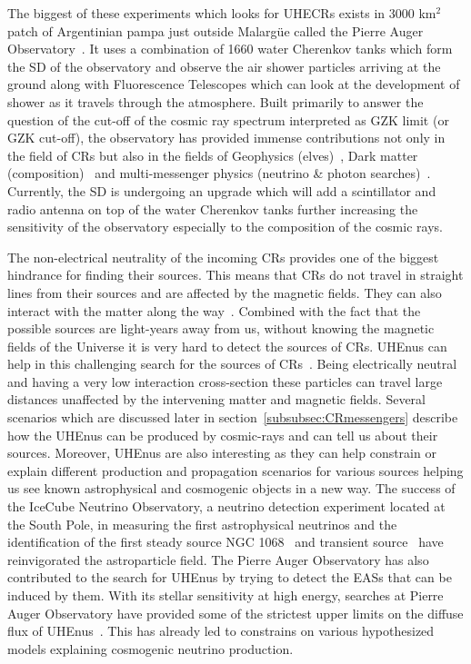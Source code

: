 The biggest of these experiments which looks for \glspl{UHECR} exists in 3000 km$^2$ patch of Argentinian pampa just outside Malargüe called the Pierre Auger Observatory~\cite{Auger:2015}. It uses a combination of 1660 water Cherenkov tanks which form the \gls{SD} of the observatory and observe the air shower particles arriving at the ground along with Fluorescence Telescopes which can look at the development of shower as it travels through the atmosphere. Built primarily to answer the question of the cut-off of the cosmic ray spectrum interpreted as \gls{GZK} limit (or GZK cut-off), the observatory has provided immense contributions not only in the field of \glspl{CR} but also in the fields of Geophysics (elves)~\cite{Mussa_2022}, Dark matter (composition)~\cite{Abreu_2023} and multi-messenger physics (neutrino \& photon searches)~\cite{Aab_2019_point,Auger_photons_2022}. Currently, the \gls{SD} is undergoing an upgrade which will add a scintillator and radio antenna on top of the water Cherenkov tanks further increasing the sensitivity of the observatory especially to the composition of the cosmic rays.

The non-electrical neutrality of the incoming \glspl{CR} provides one of the biggest hindrance for finding their sources. This means that \glspl{CR} do not travel in straight lines from their sources and are affected by the magnetic fields. They can also interact with the matter along the way~\cite{bister2024largescaleanisotropyfluxdemagnification, ALLARD201233}. Combined with the fact that the possible sources are light-years away from us, without knowing the magnetic fields of the Universe it is very hard to detect the sources of \glspl{CR}. \Glspl{UHEnu} can help in this challenging search for the sources of \glspl{CR}~\cite{UHEcorrelation_2016}. Being electrically neutral and having a very low interaction cross-section these particles can travel large distances unaffected by the intervening matter and magnetic fields. Several scenarios which are discussed later in section~\ref{subsubsec:CRmessengers} describe how the \glspl{UHEnu} can be produced by cosmic-rays and can tell us about their sources. Moreover, \glspl{UHEnu} are also interesting as they can help constrain or explain different production and propagation scenarios for various sources helping us see known astrophysical and cosmogenic objects in a new way. The success of the IceCube Neutrino Observatory, a neutrino detection experiment located at the South Pole, in measuring the first astrophysical neutrinos and the identification of the first steady source NGC 1068~\cite{Icecube_2022} and transient source~\cite{Icecube_txs} have reinvigorated the astroparticle field. The Pierre Auger Observatory has also contributed to the search for \glspl{UHEnu} by trying to detect the \glspl{EAS} that can be induced by them. With its stellar sensitivity at high energy, searches at Pierre Auger Observatory have provided some of the strictest upper limits on the diffuse flux of \glspl{UHEnu}~\cite{Aab_2019_diffuse}. This has already led to constrains on various hypothesized models explaining cosmogenic neutrino production.

